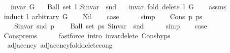 \begin{isabellebody}
\ \ \ {\isachardoublequoteopen}invar\ G{\isachardoublequoteclose}\isanewline
\ \ \ {\isachardoublequoteopen}Ball\ {\isacharparenleft}{\kern0pt}set\ l{\isacharparenright}{\kern0pt}\ {\isacharparenleft}{\kern0pt}S{\isachardot}{\kern0pt}invar\ {\isasymcirc}\ snd{\isacharparenright}{\kern0pt}{\isachardoublequoteclose}\isanewline
\ \ \ {\isachardoublequoteopen}invar\ {\isacharparenleft}{\kern0pt}fold\ delete{\isacharunderscore}{\kern0pt}{}\ l\ G{\isacharparenright}{\kern0pt}{\isachardoublequoteclose}\isanewline
%
\isadelimproof
\ \ %
\endisadelimproof
%
\isatagproof
{}\isamarkupfalse%
\ assms\isanewline
{}\isamarkupfalse%
\ {\isacharparenleft}{\kern0pt}induct\ l\ arbitrary{\isacharcolon}{\kern0pt}\ G{\isacharparenright}{\kern0pt}\isanewline
\ \ \isamarkupfalse%
\ Nil\isanewline
\ \ \isamarkupfalse%
\ {\isacharquery}{\kern0pt}case\isanewline
\ \ \ \ \isamarkupfalse%
\ simp\isanewline
{}\isamarkupfalse%
\isanewline
\ \ \isamarkupfalse%
\ {\isacharparenleft}{\kern0pt}Cons\ p\ ps{\isacharparenright}{\kern0pt}\isanewline
\ \ \isamarkupfalse%
\isanewline
\ \ \ \ {\isachardoublequoteopen}S{\isachardot}{\kern0pt}invar\ {\isacharparenleft}{\kern0pt}snd\ p{\isacharparenright}{\kern0pt}{\isachardoublequoteclose}\isanewline
\ \ \ \ {\isachardoublequoteopen}Ball\ {\isacharparenleft}{\kern0pt}set\ ps{\isacharparenright}{\kern0pt}\ {\isacharparenleft}{\kern0pt}S{\isachardot}{\kern0pt}invar\ {\isasymcirc}\ snd{\isacharparenright}{\kern0pt}{\isachardoublequoteclose}\isanewline
\ \ \ \ \isamarkupfalse%
\ simp{\isacharplus}{\kern0pt}\isanewline
\ \ \isamarkupfalse%
\ {\isacharquery}{\kern0pt}case\isanewline
\ \ \ \ \isamarkupfalse%
\ Cons{\isachardot}{\kern0pt}prems{\isacharparenleft}{\kern0pt}{}{\isacharparenright}{\kern0pt}\isanewline
\ \ \ \ \isamarkupfalse%
\ {\isacharparenleft}{\kern0pt}fastforce\ intro{\isacharcolon}{\kern0pt}\ invar{\isacharunderscore}{\kern0pt}delete{\isacharunderscore}{\kern0pt}{}\ Cons{\isachardot}{\kern0pt}hyps{\isacharparenright}{\kern0pt}\isanewline
{}\isamarkupfalse%
%
\endisatagproof
{\isafoldproof}%
%
\isadelimproof
\isanewline
%
\endisadelimproof
\isanewline
{}\isamarkupfalse%
\ {\isacharparenleft}{\kern0pt}\ adjacency{\isacharparenright}{\kern0pt}\ adjacency{\isacharunderscore}{\kern0pt}fold{\isacharunderscore}{\kern0pt}delete{\isacharunderscore}{\kern0pt}{}{\isacharunderscore}{\kern0pt}cong{\isacharcolon}{\kern0pt}\isanewline

\end{isabellebody}

